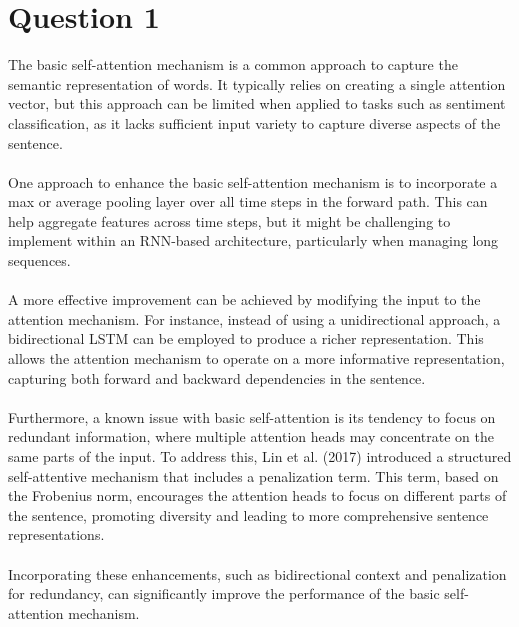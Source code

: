 \documentclass[a4paper]{article}
\begin{document}



\section*{Question 1}
\noindent
The basic self-attention mechanism is a common approach to capture the semantic representation
of words. It typically relies on creating a single attention vector, but this approach can be
limited when applied to tasks such as sentiment classification, as it lacks
sufficient input variety to capture diverse aspects of the sentence.
\\
\\
\noindent
One approach to enhance the basic self-attention mechanism is to incorporate a max or
average pooling layer over all time steps in the forward path. This can help aggregate
features across time steps, but it might be challenging to implement within an RNN-based
architecture, particularly when managing long sequences.
\\
\\
\noindent
A more effective improvement can be achieved by modifying the input to the attention mechanism.
For instance, instead of using a unidirectional approach, a bidirectional LSTM can
be employed to produce a richer representation. This allows the attention mechanism to operate on a more informative
representation, capturing both forward and backward dependencies in the sentence.
\\
\\
\noindent
Furthermore, a known issue with basic self-attention is its tendency to focus on redundant
information, where multiple attention heads may concentrate on the same parts of
the input. To address this, Lin et al. (2017) \cite{Lin} introduced a structured self-attentive mechanism that
includes a penalization term. This term, based on the Frobenius norm, encourages the
attention heads to focus on different parts of the sentence, promoting diversity and leading
to more comprehensive sentence representations.
\\
\\
\noindent
Incorporating these enhancements, such as bidirectional context and penalization for
redundancy, can significantly improve the performance of the basic self-attention mechanism.
\end{document}
